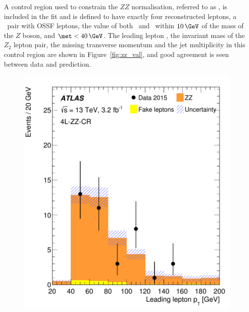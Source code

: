 A control region used to constrain the $ZZ$ normalisation, referred to as \FLCR, 
is included in the fit and
is defined to have exactly four reconstructed leptons, a \SecondZ\ pair with
OSSF leptons, the value of both \FirstZM\ and \SecondZM\ within $10\,\GeV$ of the
mass of the $Z$ boson, and $\met <40\,\GeV$. The leading lepton \pT, the 
invariant mass of the $Z_2$ lepton pair, the missing transverse momentum and the 
jet multiplicity in this control region are shown in Figure~\ref{fig:zz_val},
and good agreement is seen between data and prediction.

\begin{figure}[htbp]
\centering
\includegraphics[width=\twofigwidth]{CRZZpT1lep}

\end{figure}
